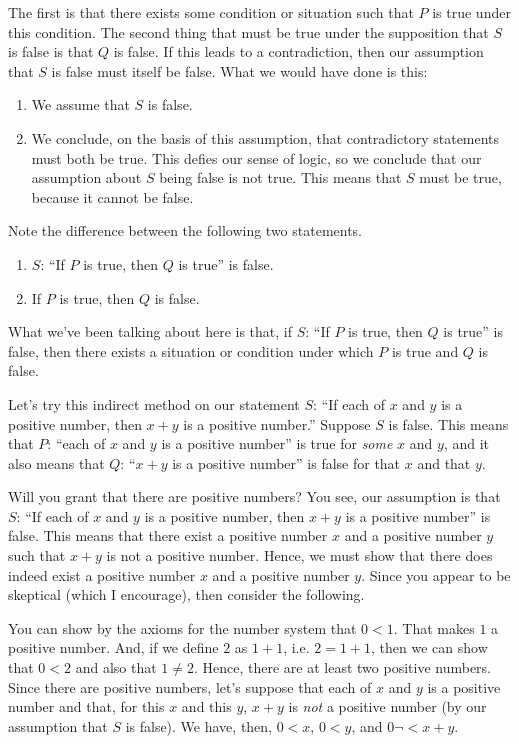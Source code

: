 \documentclass[english]{book}
\begin{document}
The first is that there exists some condition or situation such that $P$ is true under this condition. The second thing that must be true under the supposition that $S$ is false is that $Q$ is false. If this leads to a contradiction, then our assumption that $S$ is false must itself be false. What we would have done is this:
\begin{enumerate}[\hspace{1cm}1)]
  \item We assume that $S$ is false.
  \item We conclude, on the basis of this assumption, that contradictory statements must both be true. This defies our sense of logic, so we conclude that our assumption about $S$ being false is not true. This means that $S$ must be true, because it cannot be false.
\end{enumerate}

Note the difference between the following two statements.
\begin{enumerate}[\hspace{1cm}1)]
  \item $S$: ``If $P$ is true, then $Q$ is true'' is false.
  \item If $P$ is true, then $Q$ is false.
\end{enumerate}
What we've been talking about here is that, if $S$: ``If $P$ is true, then $Q$ is true'' is false, then there exists a situation or condition under which $P$ is true and $Q$ is false.

Let's try this indirect method on our statement $S$: ``If each of $x$ and $y$ is a positive number, then $x+y$ is a positive number.'' Suppose $S$ is false. This means that $P$: ``each of $x$ and $y$ is a positive number'' is true for \emph{some} $x$ and $y$, and it also means that $Q$: ``$x+y$ is a positive number'' is false for that $x$ and that $y$.

Will you grant that there are positive numbers? You see, our assumption is that $S$: ``If each of $x$ and $y$ is a positive number, then $x+y$ is a positive number'' is false. This means that there exist a positive number $x$ and a positive number $y$ such that $x+y$ is not a positive number. Hence, we must show that there does indeed exist a positive number $x$ and a positive number $y$. Since you appear to be skeptical (which I encourage), then consider the following. 

You can show by the axioms for the number system that $0<1$. That makes $1$ a positive number. And, if we define $2$ as $1+1$, i.e. $2 = 1+1$, then we can show that $0<2$ and also that $1 \neq 2$. Hence, there are at least two positive numbers. Since there are positive numbers, let's suppose that each of $x$ and $y$ is a positive number and that, for this $x$ and this $y$, $x+y$ is \emph{not} a positive number (by our assumption that $S$ is false). We have, then, $0<x$, $0<y$, and $0 \neg < x+y$. 
\end{document}
